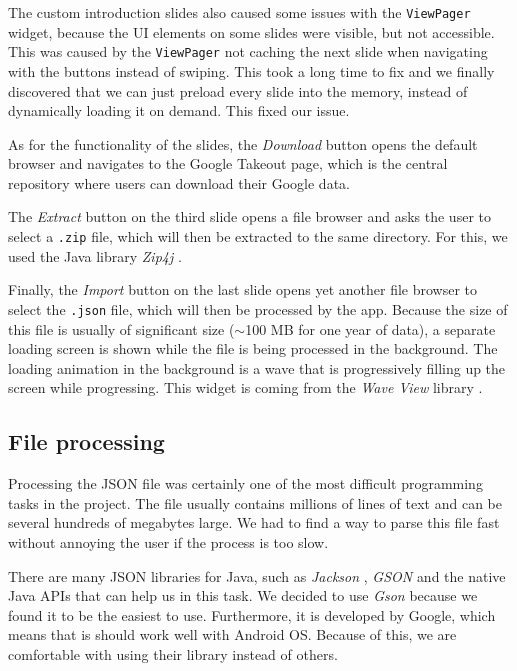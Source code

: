 \documentclass[12p]{article}
\begin{document}
    The custom introduction slides also caused some issues with the \texttt{ViewPager} widget, because the UI elements on some slides were visible, but not accessible. This was caused by the \texttt{ViewPager} not caching the next slide when navigating with the buttons instead of swiping. This took a long time to fix and we finally discovered that we can just preload every slide into the memory, instead of dynamically loading it on demand. This fixed our issue.
    
    As for the functionality of the slides, the \textit{Download} button opens the default browser and navigates to the Google Takeout page, which is the central repository where users can download their Google data.
    
    The \textit{Extract} button on the third slide opens a file browser and asks the user to select a \texttt{.zip} file, which will then be extracted to the same directory. For this, we used the Java library \textit{Zip4j} \cite{zip4j}.
    
    Finally, the \textit{Import} button on the last slide opens yet another file browser to select the \texttt{.json} file, which will then be processed by the app. Because the size of this file is usually of significant size ($\sim$100 MB for one year of data), a separate loading screen is shown while the file is being processed in the background. The loading animation in the background is a wave that is progressively filling up the screen while progressing. This widget is coming from the \textit{Wave View} library \cite{WaveView}.
    
    \subsection{File processing}
    
    Processing the JSON file was certainly one of the most difficult programming tasks in the project. The file usually contains millions of lines of text and can be several hundreds of megabytes large. We had to find a way to parse this file fast without annoying the user if the process is too slow.
    
    There are many JSON libraries for Java, such as \textit{Jackson} \cite{Jackson},  \textit{GSON} \cite{Gson} and the native Java APIs \cite{JavaJsonNative} that can help us in this task. We decided to use \textit{Gson} because we found it to be the easiest to use. Furthermore, it is developed by Google, which means that is should work well with Android OS. Because of this, we are comfortable with using their library instead of others.
    
\end{document}

